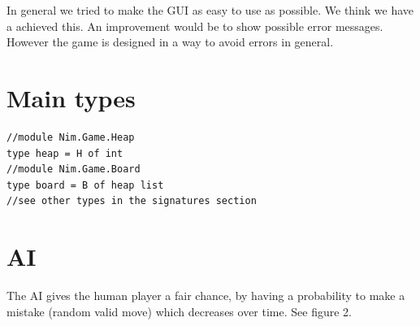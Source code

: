 \documentclass[12pt]{article}
\begin{document}
In general we tried to make the GUI as easy to use as possible. We think we have a achieved this. An improvement would be to show possible error messages. However the game is designed in a way to avoid errors in general.
    

\section*{Main types}

\lstset{language=FSharp}
\begin{lstlisting}
//module Nim.Game.Heap
type heap = H of int
//module Nim.Game.Board
type board = B of heap list
//see other types in the signatures section
    \end{lstlisting}

\section*{AI}
The AI gives the human player a fair chance, by having a probability to make a mistake (random valid move) which decreases over time. See figure 2.
\end{document}
